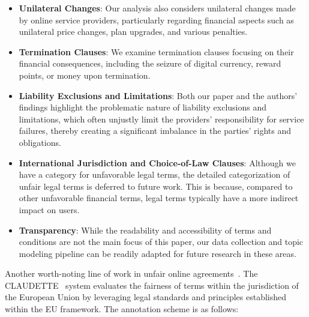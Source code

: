 \begin{itemize}
    \item \textbf{Unilateral Changes}: Our analysis also considers unilateral changes made by online service providers, particularly regarding financial aspects such as unilateral price changes, plan upgrades, and various penalties.
    \item \textbf{Termination Clauses}: We examine termination clauses focusing on their financial consequences, including the seizure of digital currency, reward points, or money upon termination.
    \item \textbf{Liability Exclusions and Limitations}: Both our paper and the authors' findings highlight the problematic nature of liability exclusions and limitations, which often unjustly limit the providers' responsibility for service failures, thereby creating a significant imbalance in the parties' rights and obligations.
    \item \textbf{International Jurisdiction and Choice-of-Law Clauses}: Although we have a category for unfavorable legal terms, the detailed categorization of unfair legal terms is deferred to future work. This is because, compared to other unfavorable financial terms, legal terms typically have a more indirect impact on users.
    
    \item \textbf{Transparency}: While the readability and accessibility of terms and conditions are not the main focus of this paper, our data collection and topic modeling pipeline can be readily adapted for future research in these areas.
\end{itemize}


Another worth-noting line of work in unfair online agreements~\citep{galassi2024unfair, galassi2020cross, lippi2019claudette, drazewski2021corpus}. The CLAUDETTE~\citep{lippi2019claudette} system evaluates the fairness of terms within the jurisdiction of the European Union by leveraging legal standards and principles established within the EU framework. The annotation scheme is as follows:

